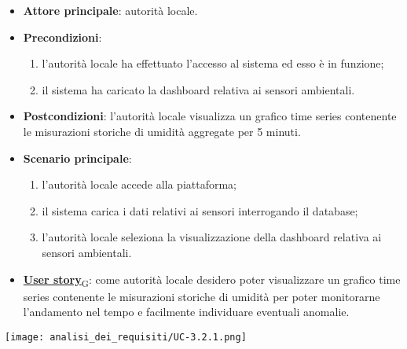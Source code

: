 \begin{itemize}
	\item \textbf{Attore principale}: autorità locale.
	\item \textbf{Precondizioni}:
	      \begin{enumerate}
		      \item l'autorità locale ha effettuato l'accesso al sistema ed esso è in funzione;
		      \item il sistema ha caricato la dashboard relativa ai sensori ambientali.
	      \end{enumerate}
	\item \textbf{Postcondizioni}: l'autorità locale visualizza un grafico time series contenente le misurazioni storiche di umidità aggregate per 5 minuti.
	\item \textbf{Scenario principale}:
	      \begin{enumerate}
		      \item l'autorità locale accede alla piattaforma;
		      \item il sistema carica i dati relativi ai sensori interrogando il database;
		      \item l'autorità locale seleziona la visualizzazione della dashboard relativa ai sensori ambientali.
	      \end{enumerate}
	\item \href{https://7last.github.io/docs/pb/documentazione-interna/glossario\#user-story}{\textbf{User story}\textsubscript{G}}:
	      come autorità locale desidero poter visualizzare un grafico time series contenente le misurazioni storiche
	      di umidità per poter monitorarne l'andamento nel tempo e facilmente individuare eventuali anomalie.
\end{itemize}
\begin{center}
	\texttt{[image: analisi\_dei\_requisiti/UC-3.2.1.png]}
\end{center}


